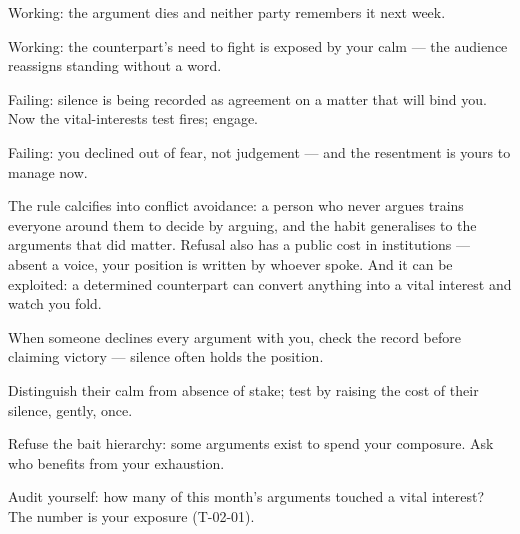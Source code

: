 \begin{feedback}
  \item Working: the argument dies and neither party remembers it next week.
  \item Working: the counterpart's need to fight is exposed by your calm --- the audience reassigns standing without a word.
  \item Failing: silence is being recorded as agreement on a matter that will bind you. Now the vital-interests test fires; engage.
  \item Failing: you declined out of fear, not judgement --- and the resentment is yours to manage now.
\end{feedback}
\begin{failure}
The rule calcifies into conflict avoidance: a person who never argues trains everyone around them to decide by arguing, and the habit generalises to the arguments that did matter. Refusal also has a public cost in institutions --- absent a voice, your position is written by whoever spoke. And it can be exploited: a determined counterpart can convert anything into a vital interest and watch you fold.
\end{failure}
\begin{countermeasures}
  \item When someone declines every argument with you, check the record before claiming victory --- silence often holds the position.
  \item Distinguish their calm from absence of stake; test by raising the cost of their silence, gently, once.
  \item Refuse the bait hierarchy: some arguments exist to spend your composure. Ask who benefits from your exhaustion.
  \item Audit yourself: how many of this month's arguments touched a vital interest? The number is your exposure (T-02-01).
\end{countermeasures}

\seesources
{}
